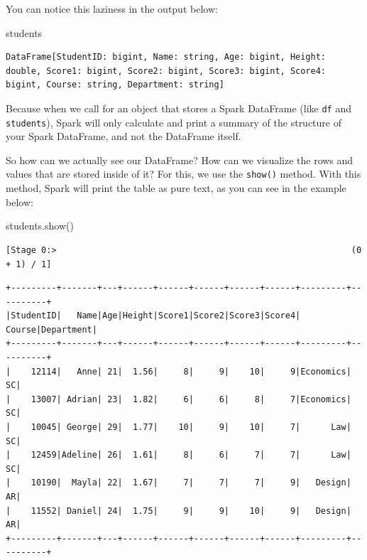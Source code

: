 \documentclass[
  11pt,
  letterpaper,
  DIV=11,
  numbers=noendperiod]{scrreprt}
\newenvironment{Shaded}{\begin{snugshade}}{\end{snugshade}}
\newcommand{\NormalTok}[1]{\textcolor[rgb]{0.00,0.23,0.31}{#1}}
\begin{document}
You can notice this laziness in the output below:

\begin{Shaded}
\begin{Highlighting}[]
\NormalTok{students}
\end{Highlighting}
\end{Shaded}

\begin{verbatim}
DataFrame[StudentID: bigint, Name: string, Age: bigint, Height: double, Score1: bigint, Score2: bigint, Score3: bigint, Score4: bigint, Course: string, Department: string]
\end{verbatim}

Because when we call for an object that stores a Spark DataFrame (like
\texttt{df} and \texttt{students}), Spark will only calculate and print
a summary of the structure of your Spark DataFrame, and not the
DataFrame itself.

So how can we actually see our DataFrame? How can we visualize the rows
and values that are stored inside of it? For this, we use the
\texttt{show()} method. With this method, Spark will print the table as
pure text, as you can see in the example below:

\begin{Shaded}
\begin{Highlighting}[]
\NormalTok{students.show()}
\end{Highlighting}
\end{Shaded}

\begin{verbatim}
[Stage 0:>                                                          (0 + 1) / 1]                                                                                
\end{verbatim}

\begin{verbatim}
+---------+-------+---+------+------+------+------+------+---------+----------+
|StudentID|   Name|Age|Height|Score1|Score2|Score3|Score4|   Course|Department|
+---------+-------+---+------+------+------+------+------+---------+----------+
|    12114|   Anne| 21|  1.56|     8|     9|    10|     9|Economics|        SC|
|    13007| Adrian| 23|  1.82|     6|     6|     8|     7|Economics|        SC|
|    10045| George| 29|  1.77|    10|     9|    10|     7|      Law|        SC|
|    12459|Adeline| 26|  1.61|     8|     6|     7|     7|      Law|        SC|
|    10190|  Mayla| 22|  1.67|     7|     7|     7|     9|   Design|        AR|
|    11552| Daniel| 24|  1.75|     9|     9|    10|     9|   Design|        AR|
+---------+-------+---+------+------+------+------+------+---------+----------+
\end{verbatim}
\end{document}
